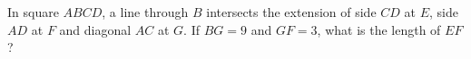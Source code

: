 In square $ABCD$, a line through $B$ intersects the extension of side $CD$ at $E$, side $AD$ at $F$ and diagonal $AC$ at $G$. If $BG=9$ and $GF=3$, what is the length of $EF$?
